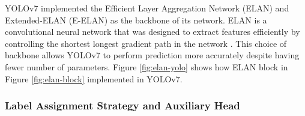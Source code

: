 
  YOLOv7 implemented the Efficient Layer Aggregation Network (ELAN) and Extended-ELAN (E-ELAN) as the backbone of its network. 
  ELAN is a convolutional neural network that was designed to extract features efficiently 
  by controlling the shortest longest gradient path in the network \parencite{elan}.
  This choice of backbone allows YOLOv7 to perform prediction more accurately despite having fewer number of parameters. 
  Figure \ref{fig:elan-yolo} shows how ELAN block in Figure \ref{fig:elan-block} implemented in YOLOv7.

  \subsubsection{Label Assignment Strategy and Auxiliary Head}
